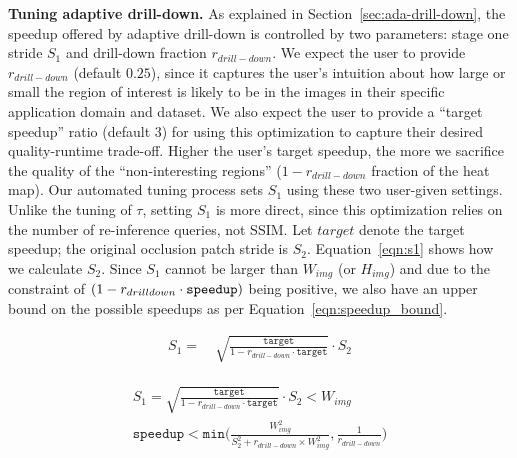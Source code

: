 \vspace{2mm}
\noindent \textbf{Tuning adaptive drill-down.}
As explained in Section~\ref{sec:ada-drill-down}, the speedup offered by adaptive drill-down is controlled by two parameters: stage one stride $S_1$ and drill-down fraction $r_{drill-down}$. We expect the user to provide $r_{drill-down}$ (default $0.25$), since it captures the user's intuition about how large or small the region of interest is likely to be in the images in their specific application domain and dataset. We also expect the user to provide a ``target speedup'' ratio (default $3$) for using this optimization to capture their desired quality-runtime trade-off. Higher the user's target speedup, the more we sacrifice the quality of the ``non-interesting regions'' ($1 - r_{drill-down}$ fraction of the heat map). Our automated tuning process sets $S_1$ using these two user-given settings. Unlike the tuning of $\tau$, setting $S_1$ is more direct, since this optimization relies on the number of re-inference queries, not SSIM. Let $\mathit{target}$ denote the target speedup; the original occlusion patch stride is $S_2$. Equation~\ref{eqn:s1} shows how we calculate $S_2$. Since $S_1$ cannot be larger than $W_{img}$ (or $H_{img}$) and due to the constraint of $(1-r_{drill\-down} \cdot \texttt{speedup})$ being positive, we also have an upper bound on the possible speedups as per Equation~\ref{eqn:speedup_bound}.

\begin{align}
\label{eqn:s1}
S_1 = &~ \sqrt{\frac{\texttt{target}}{1 - r_{drill-down} \cdot \texttt{target}}} \cdot S_2
\end{align}

\begin{align}
\label{eqn:speedup_bound}
\begin{split}
S_1 = \sqrt{\frac{\texttt{target}}{1 - r_{drill-down} \cdot \texttt{target}}} \cdot S_2 < W_{img}\\
\texttt{speedup} < \texttt{min}\Bigg(\frac{W^2_{img}}{S^2_2+r_{drill-down}\times W^2_{img}}, \frac{1}{r_{drill-down}}\Bigg)
\end{split}
\end{align}


